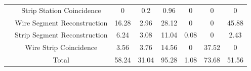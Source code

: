 \begin{table}[]
\begin{tabular}{|c|c|c|c|c|c|c|c|}
                                                                                & Strip Station Coincidence    & 0                                                         & 0.2                                                       & 0.96                                                     & 0                                                                 & 0                                                      & 0                                                      \\ \cline{2-8} 
                                                                                & Wire Segment Reconstruction  & 16.28                                                     & 2.96                                                      & 28.12                                                    & 0                                                                 & 0                                                      & 45.88                                                  \\ \cline{2-8} 
                                                                                & Strip Segment Reconstruction & 6.24                                                      & 3.08                                                      & 11.04                                                    & 0.08                                                              & 0                                                      & 2.43                                                   \\ \cline{2-8} 
                                                                                & Wire Strip Coincidence       & 3.56                                                      & 3.76                                                      & 14.56                                                    & 0                                                                 & 37.52                                                  & 0                                                      \\ \cline{2-8} 
                                                                                & Total                        & 58.24                                                     & 31.04                                                     & 95.28                                                    & 1.08                                                              & 73.68                                                  & 51.56                                                  \\ \hline\hline

\end{tabular}
\end{table}
